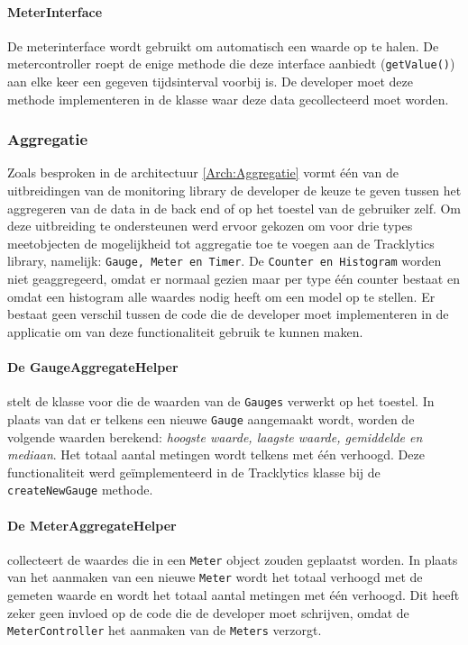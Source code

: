 \paragraph{MeterInterface}\label{Klassediagram:MeterInferface}
De meterinterface wordt gebruikt om automatisch een waarde op te halen. De metercontroller roept de enige methode die deze interface aanbiedt (\texttt{getValue()}) aan elke keer een gegeven tijdsinterval voorbij is. De developer moet deze methode implementeren in de klasse waar deze data gecollecteerd moet worden.  



\subsubsection{Aggregatie}
Zoals besproken in de architectuur \ref{Arch:Aggregatie} vormt \'e\'en van de uitbreidingen van de monitoring library de developer de keuze te geven tussen het aggregeren van de data in de back end of op het toestel van de gebruiker zelf. Om deze uitbreiding te ondersteunen werd ervoor gekozen om voor drie types meetobjecten de mogelijkheid tot aggregatie toe te voegen aan de Tracklytics library, namelijk: \texttt{Gauge, Meter en Timer}. De \texttt{Counter en Histogram} worden niet geaggregeerd, omdat er normaal gezien maar per type \'e\'en counter bestaat en omdat een histogram alle waardes nodig heeft om een model op te stellen. Er bestaat geen verschil tussen de code die de developer moet implementeren in de applicatie om van deze functionaliteit gebruik te kunnen maken.\\

\paragraph{De GaugeAggregateHelper} stelt de klasse voor die de waarden van de \texttt{Gauges} verwerkt op het toestel. In plaats van dat er telkens een nieuwe \texttt{Gauge} aangemaakt wordt, worden de volgende waarden berekend: \textit{hoogste waarde, laagste waarde, gemiddelde en mediaan}. Het totaal aantal metingen wordt telkens met \'e\'en verhoogd. Deze functionaliteit werd ge\"implementeerd in de Tracklytics klasse bij de \texttt{createNewGauge} methode. 

\paragraph{De MeterAggregateHelper} collecteert de waardes die in een \texttt{Meter} object zouden geplaatst worden. In plaats van het aanmaken van een nieuwe \texttt{Meter} wordt het totaal verhoogd met de gemeten waarde en wordt het totaal aantal metingen met \'e\'en verhoogd. Dit heeft zeker geen invloed op de code die de developer moet schrijven, omdat de \texttt{MeterController} het aanmaken van de \texttt{Meters} verzorgt.


